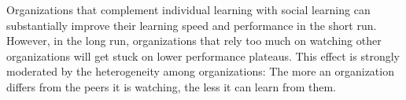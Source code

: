Organizations that complement individual learning with social learning can substantially improve their learning speed and performance in the short run. However, in the long run, organizations that rely too much on watching other organizations will get stuck on lower performance plateaus. This effect is strongly moderated by the heterogeneity among organizations: The more an organization differs from the peers it is watching, the less it can learn from them. 



